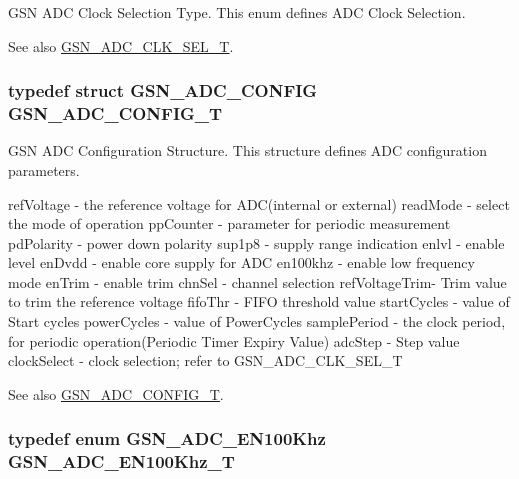 GSN ADC Clock Selection Type. This enum defines ADC Clock Selection. 

\begin{DoxySeeAlso}{See also}
\hyperlink{a00643_ga36798ea9dfbf3935126b374c4dba00dd}{GSN\_\-ADC\_\-CLK\_\-SEL\_\-T}. 
\end{DoxySeeAlso}
\hypertarget{a00643_ga791ca7ba8984ef3e22b1790a1abd2bb4}{
\subsubsection[{GSN\_\-ADC\_\-CONFIG\_\-T}]{\setlength{\rightskip}{0pt plus 5cm}typedef struct {\bf GSN\_\-ADC\_\-CONFIG}  {\bf GSN\_\-ADC\_\-CONFIG\_\-T}}}
\label{a00643_ga791ca7ba8984ef3e22b1790a1abd2bb4}


GSN ADC Configuration Structure. This structure defines ADC configuration parameters. 

refVoltage -\/ the reference voltage for ADC(internal or external) readMode -\/ select the mode of operation ppCounter -\/ parameter for periodic measurement pdPolarity -\/ power down polarity sup1p8 -\/ supply range indication enlvl -\/ enable level enDvdd -\/ enable core supply for ADC en100khz -\/ enable low frequency mode enTrim -\/ enable trim chnSel -\/ channel selection refVoltageTrim-\/ Trim value to trim the reference voltage fifoThr -\/ FIFO threshold value startCycles -\/ value of Start cycles powerCycles -\/ value of PowerCycles samplePeriod -\/ the clock period, for periodic operation(Periodic Timer Expiry Value) adcStep -\/ Step value clockSelect -\/ clock selection; refer to GSN\_\-ADC\_\-CLK\_\-SEL\_\-T

\begin{DoxySeeAlso}{See also}
\hyperlink{a00643_ga791ca7ba8984ef3e22b1790a1abd2bb4}{GSN\_\-ADC\_\-CONFIG\_\-T}. 
\end{DoxySeeAlso}
\hypertarget{a00643_gacdca24ad9324635589139ad12ce67090}{
\subsubsection[{GSN\_\-ADC\_\-EN100Khz\_\-T}]{\setlength{\rightskip}{0pt plus 5cm}typedef enum {\bf GSN\_\-ADC\_\-EN100Khz}  {\bf GSN\_\-ADC\_\-EN100Khz\_\-T}}}
\label{a00643_gacdca24ad9324635589139ad12ce67090}


